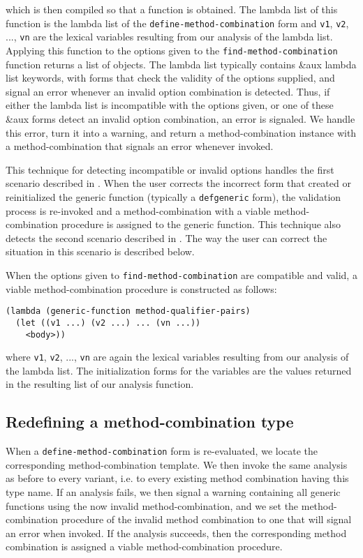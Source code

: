 \noindent
which is then compiled so that a function is obtained.  The lambda
list of this function is the lambda list of the
\texttt{define-method-combination} form and \texttt{v1}, \texttt{v2},
..., \texttt{vn} are the lexical variables resulting from our analysis
of the lambda list.  Applying this function to the options given to
the \texttt{find-method-combination} function returns a list of
objects.  The lambda list typically
contains \&aux lambda list keywords, with forms that check the
validity of the options supplied, and signal an error whenever an
invalid option combination is detected.  Thus, if either the lambda
list is incompatible with the options given, or one of these \&aux
forms detect an invalid option combination, an error is signaled.  We
handle this error, turn it into a warning, and return a
method-combination instance with a method-combination that signals an
error whenever invoked.

This technique for detecting incompatible or invalid options handles
the first scenario described in .  When the
user corrects the incorrect form that created or reinitialized the
generic function (typically a \texttt{defgeneric} form), the
validation process is re-invoked and a method-combination with a
viable method-combination procedure is assigned to the generic
function.  This technique also detects the second scenario described
in .  The way the user can correct the
situation in this scenario is described below.

When the options given to \texttt{find-method-combination} are
compatible and valid, a viable method-combination procedure is
constructed as follows:

\begin{verbatim}
(lambda (generic-function method-qualifier-pairs)
  (let ((v1 ...) (v2 ...) ... (vn ...))
    <body>))
\end{verbatim}

\noindent
where \texttt{v1}, \texttt{v2}, ..., \texttt{vn} are again the lexical
variables resulting from our analysis of the lambda list.  The
initialization forms for the variables are the values returned in the
resulting list of our analysis function.

\subsection{Redefining a method-combination type}

When a \texttt{define-method-combination} form is re-evaluated, we
locate the corresponding method-combination template.  We then invoke
the same analysis as before to every variant, i.e. to every existing
method combination having this type name.  If an analysis fails, we
then signal a warning containing all generic functions using the now
invalid method-combination, and we set the method-combination
procedure of the invalid method combination to one that will signal an
error when invoked.  If the analysis succeeds, then the corresponding
method combination is assigned a viable method-combination procedure.

